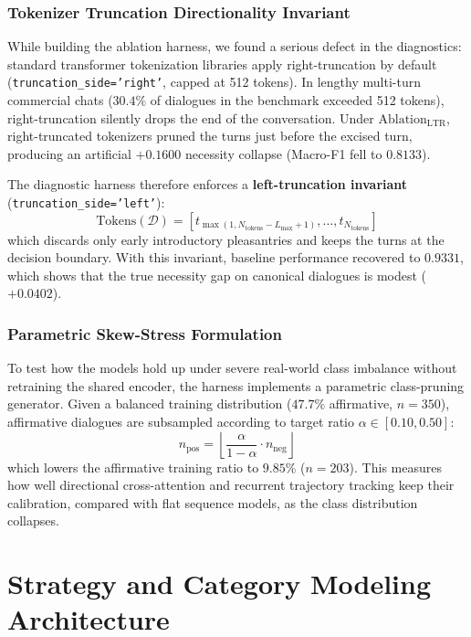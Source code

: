 \subsubsection{Tokenizer Truncation Directionality Invariant}
While building the ablation harness, we found a serious defect in the diagnostics: standard transformer tokenization libraries apply right-truncation by default (\texttt{truncation\_side='right'}, capped at 512 tokens). In lengthy multi-turn commercial chats ($30.4\%$ of dialogues in the benchmark exceeded 512 tokens), right-truncation silently drops the end of the conversation. Under $\text{Ablation}_{\text{LTR}}$, right-truncated tokenizers pruned the turns just before the excised turn, producing an artificial $+0.1600$ necessity collapse (Macro-F1 fell to $0.8133$).

The diagnostic harness therefore enforces a \textbf{left-truncation invariant} (\texttt{truncation\_side='left'}):
\begin{equation}
  \text{Tokens}(\mathcal{D}) = [t_{\max(1, N_{\text{tokens}} - L_{\max} + 1)}, \dots, t_{N_{\text{tokens}}}]
\end{equation}
which discards only early introductory pleasantries and keeps the turns at the decision boundary. With this invariant, baseline performance recovered to $0.9331$, which shows that the true necessity gap on canonical dialogues is modest ($+0.0402$).

\subsubsection{Parametric Skew-Stress Formulation}
To test how the models hold up under severe real-world class imbalance without retraining the shared encoder, the harness implements a parametric class-pruning generator. Given a balanced training distribution ($47.7\%$ affirmative, $n=350$), affirmative dialogues are subsampled according to target ratio $\alpha \in [0.10, 0.50]$:
\begin{equation}
  n_{\text{pos}} = \left\lfloor \frac{\alpha}{1 - \alpha} \cdot n_{\text{neg}} \right\rfloor
\end{equation}
which lowers the affirmative training ratio to $9.85\%$ ($n=203$). This measures how well directional cross-attention and recurrent trajectory tracking keep their calibration, compared with flat sequence models, as the class distribution collapses.

\section{Strategy and Category Modeling Architecture}
\label{sec:strategy-modeling}


